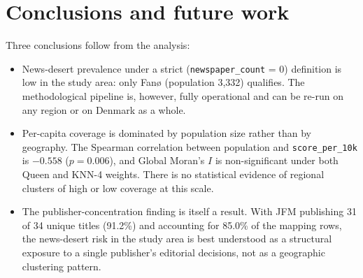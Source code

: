 \documentclass[12pt, a4paper]{article}
\begin{document}
\section{Conclusions and future work}
Three conclusions follow from the analysis:
\begin{itemize}
    \item News-desert prevalence under a strict (\texttt{newspaper\_count} = 0) definition is low in the study area: only Fanø (population 3{,}332) qualifies. The methodological pipeline is, however, fully operational and can be re-run on any region or on Denmark as a whole.
    \item Per-capita coverage is dominated by population size rather than by geography. The Spearman correlation between population and \texttt{score\_per\_10k} is $-0.558$ ($p = 0.006$), and Global Moran's $I$ is non-significant under both Queen and KNN-4 weights. There is no statistical evidence of regional clusters of high or low coverage at this scale.
    \item The publisher-concentration finding is itself a result. With JFM
    publishing 31 of 34 unique titles (91.2\%) and accounting for 85.0\% of the
    mapping rows, the news-desert risk in the study area is best understood as a
    structural exposure to a single publisher's editorial decisions, not as a
    geographic clustering pattern.
 \end{itemize}
\printbibliography
\end{document}
